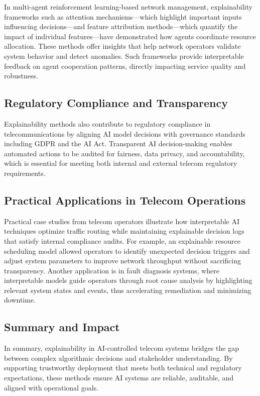 \documentclass[sigconf]{acmart}
\begin{document}
In multi-agent reinforcement learning-based network management, explainability frameworks such as attention mechanisms—which highlight important inputs influencing decisions—and feature attribution methods—which quantify the impact of individual features—have demonstrated how agents coordinate resource allocation. These methods offer insights that help network operators validate system behavior and detect anomalies. Such frameworks provide interpretable feedback on agent cooperation patterns, directly impacting service quality and robustness.

\subsection{Regulatory Compliance and Transparency}

Explainability methods also contribute to regulatory compliance in telecommunications by aligning AI model decisions with governance standards including GDPR and the AI Act. Transparent AI decision-making enables automated actions to be audited for fairness, data privacy, and accountability, which is essential for meeting both internal and external telecom regulatory requirements.

\subsection{Practical Applications in Telecom Operations}

Practical case studies from telecom operators illustrate how interpretable AI techniques optimize traffic routing while maintaining explainable decision logs that satisfy internal compliance audits. For example, an explainable resource scheduling model allowed operators to identify unexpected decision triggers and adjust system parameters to improve network throughput without sacrificing transparency. Another application is in fault diagnosis systems, where interpretable models guide operators through root cause analysis by highlighting relevant system states and events, thus accelerating remediation and minimizing downtime.

\subsection{Summary and Impact}

In summary, explainability in AI-controlled telecom systems bridges the gap between complex algorithmic decisions and stakeholder understanding. By supporting trustworthy deployment that meets both technical and regulatory expectations, these methods ensure AI systems are reliable, auditable, and aligned with operational goals.
\end{document}
